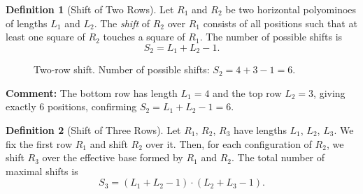 \documentclass{article}
\theoremstyle{definition}
\newtheorem{definition}{Definition}[section]
\theoremstyle{plain}
\begin{document}
\begin{definition}[Shift of Two Rows]
Let $R_1$ and $R_2$ be two horizontal polyominoes of lengths $L_1$ and 
$L_2$. The \emph{shift} of $R_2$ over $R_1$ consists of all positions 
such that at least one square of $R_2$ touches a square of $R_1$. The 
number of possible shifts is
\[
S_2 = L_1 + L_2 - 1.
\]
\end{definition}

\begin{figure}[H]
\centering
{}
\caption{Two-row shift. Number of possible shifts: $S_2 = 4 + 3 - 1 = 6$.}
\label{fig:two_row_shift_correct}
\end{figure}

\noindent
\textbf{Comment:} The bottom row has length $L_1 = 4$ and the top row 
$L_2 = 3$, giving exactly $6$ positions, confirming 
$S_2 = L_1 + L_2 - 1 = 6$.

\begin{definition}[Shift of Three Rows]
Let $R_1$, $R_2$, $R_3$ have lengths $L_1$, $L_2$, $L_3$. We fix the 
first row $R_1$ and shift $R_2$ over it. Then, for each configuration of 
$R_2$, we shift $R_3$ over the effective base formed by $R_1$ and $R_2$. 
The total number of maximal shifts is
\[
S_3 = (L_1 + L_2 - 1) \cdot (L_2 + L_3 - 1).
\]
\end{definition}
\end{document}
